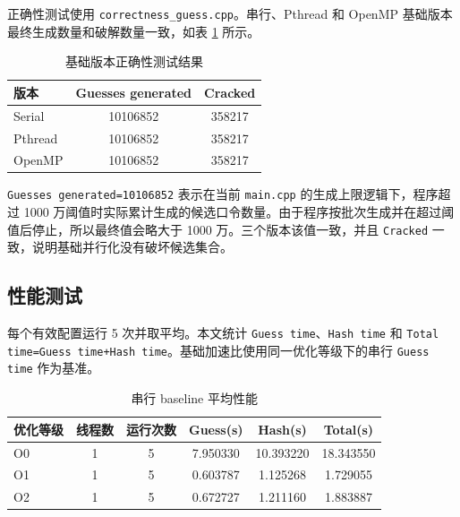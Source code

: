 \documentclass[UTF8,a4paper,12pt]{ctexart}
\begin{document}
正确性测试使用 \texttt{correctness\_guess.cpp}。串行、Pthread 和 OpenMP 基础版本最终生成数量和破解数量一致，如表 \ref{tab:correctness} 所示。

\begin{table}[htbp]
  \centering
  \caption{基础版本正确性测试结果}
  \label{tab:correctness}
  \begin{tabular}{lcc}
    \toprule
    版本 & Guesses generated & Cracked \\
    \midrule
    Serial & 10106852 & 358217 \\
    Pthread & 10106852 & 358217 \\
    OpenMP & 10106852 & 358217 \\
    \bottomrule
  \end{tabular}
\end{table}

\texttt{Guesses generated=10106852} 表示在当前 \texttt{main.cpp} 的生成上限逻辑下，程序超过 1000 万阈值时实际累计生成的候选口令数量。由于程序按批次生成并在超过阈值后停止，所以最终值会略大于 1000 万。三个版本该值一致，并且 \texttt{Cracked} 一致，说明基础并行化没有破坏候选集合。

\subsection{性能测试}

每个有效配置运行 5 次并取平均。本文统计 \texttt{Guess time}、\texttt{Hash time} 和 \texttt{Total time=Guess time+Hash time}。基础加速比使用同一优化等级下的串行 \texttt{Guess time} 作为基准。

\begin{table}[htbp]
  \centering
  \caption{串行 baseline 平均性能}
  \label{tab:serial}
  \begin{tabular}{lccccc}
    \toprule
    优化等级 & 线程数 & 运行次数 & Guess(s) & Hash(s) & Total(s) \\
    \midrule
    O0 & 1 & 5 & 7.950330 & 10.393220 & 18.343550 \\
    O1 & 1 & 5 & 0.603787 & 1.125268 & 1.729055 \\
    O2 & 1 & 5 & 0.672727 & 1.211160 & 1.883887 \\
    \bottomrule
  \end{tabular}
\end{table}
\end{document}

